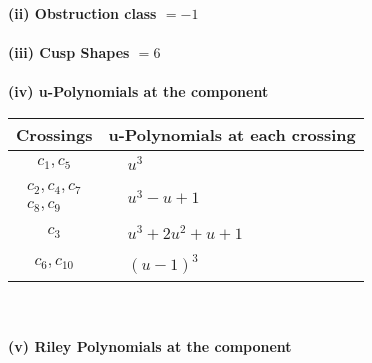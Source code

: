 \documentclass[1p]{elsarticle_modified}
\theoremstyle{definition}
\begin{document}
\flushleft \textbf{(ii) Obstruction class $= -1$}\\~\\
\flushleft \textbf{(iii) Cusp Shapes $= 6$}\\~\\
\newpage\renewcommand{\arraystretch}{1}
\flushleft \textbf{(iv) u-Polynomials at the component}\newline \\
\begin{tabular}{m{50pt}|m{274pt}}
Crossings & \hspace{64pt}u-Polynomials at each crossing \\
\hline $$\begin{aligned}c_{1},c_{5}\end{aligned}$$&$\begin{aligned}
&u^3
\end{aligned}$\\
\hline $$\begin{aligned}c_{2},c_{4},c_{7}\\c_{8},c_{9}\end{aligned}$$&$\begin{aligned}
&u^3- u+1
\end{aligned}$\\
\hline $$\begin{aligned}c_{3}\end{aligned}$$&$\begin{aligned}
&u^3+2 u^2+u+1
\end{aligned}$\\
\hline $$\begin{aligned}c_{6},c_{10}\end{aligned}$$&$\begin{aligned}
&(u-1)^3
\end{aligned}$\\
\hline
\end{tabular}\\~\\
\newpage\renewcommand{\arraystretch}{1}
\flushleft \textbf{(v) Riley Polynomials at the component}\newline \\
\end{document}
